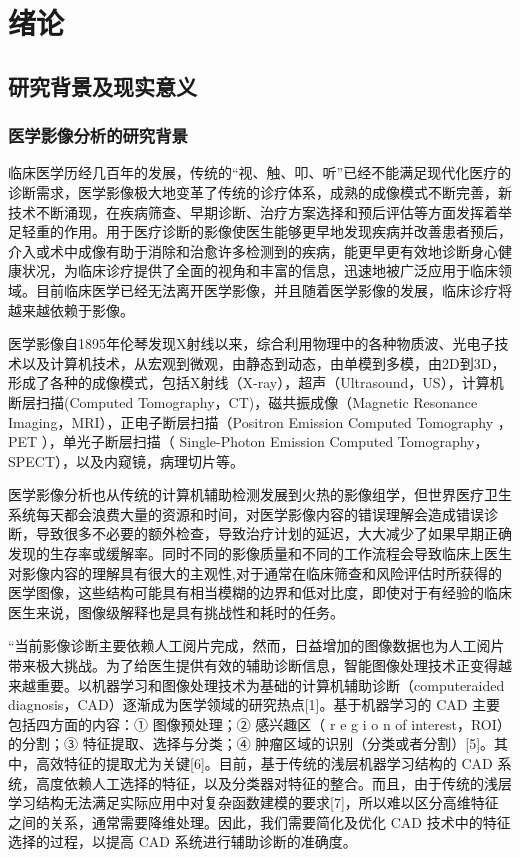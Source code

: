 \chapter{绪论}
\label{chap:introduction}

\section{研究背景及现实意义}
\subsection{医学影像分析的研究背景}

临床医学历经几百年的发展，传统的“视、触、叩、听”已经不能满足现代化医疗的诊断需求，医学影像极大地变革了传统的诊疗体系，成熟的成像模式不断完善，新技术不断涌现，在疾病筛查、早期诊断、治疗方案选择和预后评估等方面发挥着举足轻重的作用。用于医疗诊断的影像使医生能够更早地发现疾病并改善患者预后，介入或术中成像有助于消除和治愈许多检测到的疾病，能更早更有效地诊断身心健康状况，为临床诊疗提供了全面的视角和丰富的信息，迅速地被广泛应用于临床领域。目前临床医学已经无法离开医学影像，并且随着医学影像的发展，临床诊疗将越来越依赖于影像。

医学影像自1895年伦琴发现X射线以来，综合利用物理中的各种物质波、光电子技术以及计算机技术，从宏观到微观，由静态到动态，由单模到多模，由2D到3D，形成了各种的成像模式，包括X射线（X-ray），超声（Ultrasound，US），计算机断层扫描(Computed Tomography，CT)，磁共振成像（Magnetic Resonance Imaging，MRI），正电子断层扫描（Positron Emission Computed Tomography ， PET ），单光子断层扫描（ Single-Photon  Emission Computed Tomography，SPECT），以及内窥镜，病理切片等。

医学影像分析也从传统的计算机辅助检测发展到火热的影像组学，但世界医疗卫生系统每天都会浪费大量的资源和时间，对医学影像内容的错误理解会造成错误诊断，导致很多不必要的额外检查，导致治疗计划的延迟，大大减少了如果早期正确发现的生存率或缓解率。同时不同的影像质量和不同的工作流程会导致临床上医生对影像内容的理解具有很大的主观性,对于通常在临床筛查和风险评估时所获得的医学图像，这些结构可能具有相当模糊的边界和低对比度，即使对于有经验的临床医生来说，图像级解释也是具有挑战性和耗时的任务。

“当前影像诊断主要依赖人工阅片完成，然而，日益增加的图像数据也为人工阅片带来极大挑战。为了给医生提供有效的辅助诊断信息，智能图像处理技术正变得越来越重要。以机器学习和图像处理技术为基础的计算机辅助诊断（computeraided diagnosis，CAD）逐渐成为医学领域的研究热点[1]。基于机器学习的 CAD 主要包括四方面的内容：① 图像预处理；② 感兴趣区（ r e g i o n of interest，ROI）的分割；③ 特征提取、选择与分类；④ 肿瘤区域的识别（分类或者分割）[5]。其中，高效特征的提取尤为关键[6]。目前，基于传统的浅层机器学习结构的 CAD 系统，高度依赖人工选择的特征，以及分类器对特征的整合。而且，由于传统的浅层学习结构无法满足实际应用中对复杂函数建模的要求[7]，所以难以区分高维特征之间的关系，通常需要降维处理。因此，我们需要简化及优化 CAD 技术中的特征选择的过程，以提高 CAD 系统进行辅助诊断的准确度。

